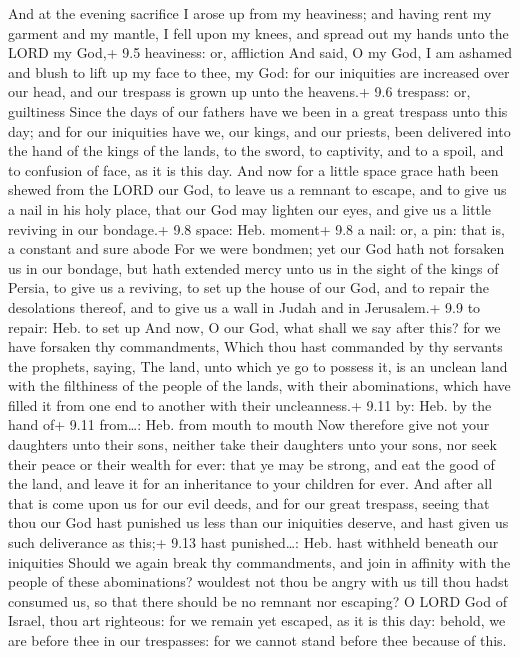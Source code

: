  And at the evening sacrifice I arose up from my
heaviness; and having rent my garment and my mantle, I fell upon my
knees, and spread out my hands unto the LORD my God,+ 9.5 heaviness: or,
affliction  And said, O my God, I am ashamed and blush to
lift up my face to thee, my God: for our iniquities are increased over
our head, and our trespass is grown up unto the heavens.+ 9.6 trespass:
or, guiltiness  Since the days of our fathers have we been
in a great trespass unto this day; and for our iniquities have we, our
kings, and our priests, been delivered into the hand of the kings of the
lands, to the sword, to captivity, and to a spoil, and to confusion of
face, as it is this day.  And now for a little space grace
hath been shewed from the LORD our God, to leave us a remnant to escape,
and to give us a nail in his holy place, that our God may lighten our
eyes, and give us a little reviving in our bondage.+ 9.8 space: Heb.
moment+ 9.8 a nail: or, a pin: that is, a constant and sure abode
 For we were bondmen; yet our God hath not forsaken us in
our bondage, but hath extended mercy unto us in the sight of the kings
of Persia, to give us a reviving, to set up the house of our God, and to
repair the desolations thereof, and to give us a wall in Judah and in
Jerusalem.+ 9.9 to repair: Heb. to set up  And now, O our
God, what shall we say after this? for we have forsaken thy
commandments,  Which thou hast commanded by thy servants
the prophets, saying, The land, unto which ye go to possess it, is an
unclean land with the filthiness of the people of the lands, with their
abominations, which have filled it from one end to another with their
uncleanness.+ 9.11 by: Heb. by the hand of+ 9.11 from\ldots: Heb. from
mouth to mouth  Now therefore give not your daughters unto
their sons, neither take their daughters unto your sons, nor seek their
peace or their wealth for ever: that ye may be strong, and eat the good
of the land, and leave it for an inheritance to your children for ever.
 And after all that is come upon us for our evil deeds, and
for our great trespass, seeing that thou our God hast punished us less
than our iniquities deserve, and hast given us such deliverance as
this;+ 9.13 hast punished\ldots: Heb. hast withheld beneath our
iniquities  Should we again break thy commandments, and
join in affinity with the people of these abominations? wouldest not
thou be angry with us till thou hadst consumed us, so that there should
be no remnant nor escaping?  O LORD God of Israel, thou art
righteous: for we remain yet escaped, as it is this day: behold, we are
before thee in our trespasses: for we cannot stand before thee because
of this.

